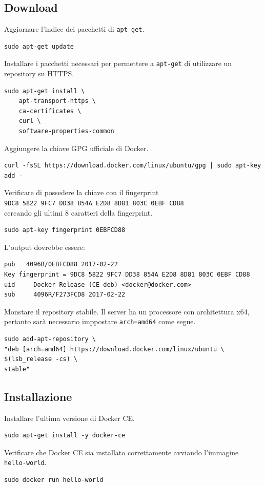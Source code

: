 \subsection{Download}
Aggiornare l'indice dei pacchetti di \verb|apt-get|.
\begin{lstlisting}
sudo apt-get update
\end{lstlisting}
Installare i pacchetti necessari per permettere a \verb|apt-get| di utilizzare un repository su HTTPS.
\begin{lstlisting}
sudo apt-get install \ 
    apt-transport-https \
    ca-certificates \
    curl \
    software-properties-common
\end{lstlisting}
Aggiungere la chiave GPG ufficiale di Docker.
\begin{lstlisting}
curl -fsSL https://download.docker.com/linux/ubuntu/gpg | sudo apt-key add -
\end{lstlisting}
Verificare di possedere la chiave con il fingerprint\\
\verb|9DC8 5822 9FC7 DD38 854A E2D8 8D81 803C 0EBF CD88|\\
cercando gli ultimi 8 caratteri della fingerprint.
\begin{lstlisting}
sudo apt-key fingerprint 0EBFCD88
\end{lstlisting}
L'output dovrebbe essere:
\begin{lstlisting}
pub   4096R/0EBFCD88 2017-02-22
Key fingerprint = 9DC8 5822 9FC7 DD38 854A E2D8 8D81 803C 0EBF CD88
uid     Docker Release (CE deb) <docker@docker.com>
sub     4096R/F273FCD8 2017-02-22
\end{lstlisting}
Monstare il repository stabile. Il server ha un processore con architettura x64, pertanto sarà necessario imppostare \verb|arch=amd64| come segue.
\begin{lstlisting}
sudo add-apt-repository \
"deb [arch=amd64] https://download.docker.com/linux/ubuntu \
$(lsb_release -cs) \
stable"
\end{lstlisting}

\subsection{Installazione}
Installare l'ultima versione di Docker CE.
\begin{lstlisting}
sudo apt-get install -y docker-ce
\end{lstlisting}
Verificare che Docker CE sia installato correttamente avviando l'immagine \verb|hello-world|.
\begin{lstlisting}
sudo docker run hello-world
\end{lstlisting}


